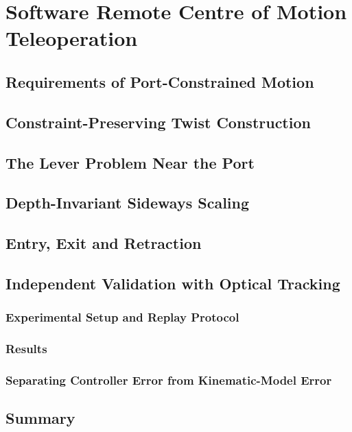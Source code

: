 \chapter{Software Remote Centre of Motion Teleoperation}
\label{ch:rcm}

\section{Requirements of Port-Constrained Motion}
\label{sec:rcm-requirements}

\section{Constraint-Preserving Twist Construction}
\label{sec:rcm-twist}

\section{The Lever Problem Near the Port}
\label{sec:rcm-lever}

\section{Depth-Invariant Sideways Scaling}
\label{sec:rcm-scaling}

\section{Entry, Exit and Retraction}
\label{sec:rcm-entry-exit}

\section{Independent Validation with Optical Tracking}
\label{sec:rcm-validation}

\subsection{Experimental Setup and Replay Protocol}
\label{sec:rcm-validation-setup}

\subsection{Results}
\label{sec:rcm-validation-results}

\subsection{Separating Controller Error from Kinematic-Model Error}
\label{sec:rcm-model-error}

\section{Summary}
\label{sec:rcm-summary}
